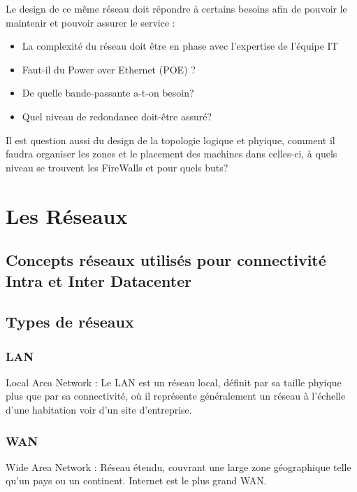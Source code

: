 \documentclass{report}
\begin{document}
		Le design de ce même réseau doit répondre à certains besoins afin de pouvoir le maintenir et pouvoir assurer le service : \\

		\begin{itemize}
			\item La complexité du réseau doit être en phase avec l'expertise de l'équipe IT
			\item Faut-il du Power over Ethernet (POE) ?
			\item De quelle bande-passante a-t-on besoin?
			\item Quel niveau de redondance doit-être assuré?\\
		\end{itemize}

		Il est question aussi du design de la topologie logique et phyique, comment il faudra organiser les zones et le placement des machines dans celles-ci, à quels niveau se trouvent les FireWalls et pour quels buts? \\

\chapter{Les Réseaux}

	\section{Concepts réseaux utilisés pour connectivité Intra et Inter Datacenter}

	\section{Types de réseaux}

		\subsection{LAN}

			Local Area Network : Le LAN est un réseau local, définit par sa taille phyique plus que par sa connectivité, où il représente généralement un réseau à l'échelle d'une habitation voir d'un site d'entreprise.\\

		\subsection{WAN}

			Wide Area Network : Réseau étendu, couvrant une large zone géographique telle qu'un pays ou un continent. Internet est le plus grand WAN.\\
\end{document}
